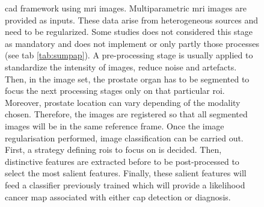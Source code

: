 \begin{figure}
\begin{adjustwidth}{-1.5cm}{}
\caption{\ac{cad} framework using \ac{mri} images. Multiparametric \ac{mri} images are provided as inputs. These data arise from heterogeneous sources and need to be regularized. Some studies does not considered this stage as mandatory and does not implement or only partly those processes (see \acs{tab} \ref{tab:sumpap}). A pre-processing stage is usually applied to standardize the intensity of images, reduce noise and artefacts. Then, in the image set, the prostate organ has to be segmented to focus the next processing stages only on that particular \ac{roi}. Moreover, prostate location can vary depending of the modality chosen. Therefore, the images are registered so that all segmented images will be in the same reference frame. Once the image regularisation performed, image classification can be carried out. First, a strategy defining \acp{roi} to focus on is decided. Then, distinctive features are extracted before to be post-processed to select the most salient features. Finally, these salient features will feed a classifier previously trained which will provide a likelihood cancer map associated with either \ac{cap} detection or diagnosis.}
\end{adjustwidth}
\label{fig:wkfcad}
\end{figure}

